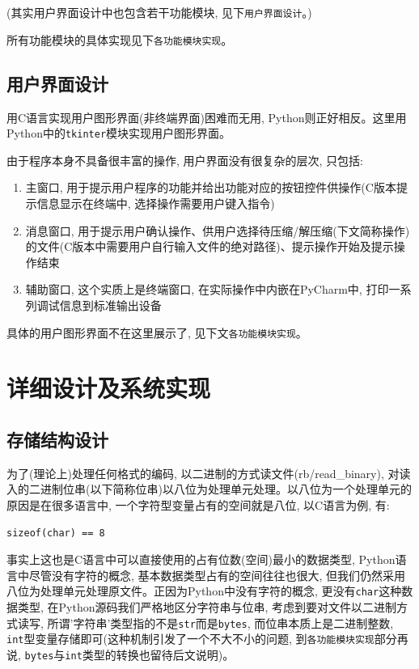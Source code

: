 \documentclass{ctexart}
\begin{document}
(其实用户界面设计中也包含若干功能模块, 见下\texttt{用户界面设计}。)

所有功能模块的具体实现见下\texttt{各功能模块实现}。

\subsection{用户界面设计}\label{header-n123}

用C语言实现用户图形界面(非终端界面)困难而无用, Python则正好相反。这里用Python中的\texttt{tkinter}模块实现用户图形界面。

由于程序本身不具备很丰富的操作, 用户界面没有很复杂的层次, 只包括:

\begin{enumerate}
\def\labelenumi{\arabic{enumi}.}
\item
  主窗口, 用于提示用户程序的功能并给出功能对应的按钮控件供操作(C版本提示信息显示在终端中, 选择操作需要用户键入指令)
\item
  消息窗口, 用于提示用户确认操作、供用户选择待压缩/解压缩(下文简称操作)的文件(C版本中需要用户自行输入文件的绝对路径)、提示操作开始及提示操作结束
\item
  辅助窗口, 这个实质上是终端窗口, 在实际操作中内嵌在PyCharm中, 打印一系列调试信息到标准输出设备
\end{enumerate}

具体的用户图形界面不在这里展示了, 见下文\texttt{各功能模块实现}。


\section{详细设计及系统实现}\label{header-n134}

\subsection{存储结构设计}\label{header-n135}

为了(理论上)处理任何格式的编码, 以二进制的方式读文件(rb/read\_binary), 对读入的二进制位串(以下简称位串)以八位为处理单元处理。以八位为一个处理单元的原因是在很多语言中, 一个字符型变量占有的空间就是八位, 以C语言为例, 有:

{\setmainfont{Courier New Bold}              
\begin{lstlisting}
sizeof(char) == 8
\end{lstlisting}}

事实上这也是C语言中可以直接使用的占有位数(空间)最小的数据类型, Python语言中尽管没有字符的概念, 基本数据类型占有的空间往往也很大, 但我们仍然采用八位为处理单元处理原文件。正因为Python中没有字符的概念, 更没有\texttt{char}这种数据类型, 在Python源码我们严格地区分字符串与位串, 考虑到要对文件以二进制方式读写, 所谓'字符串'类型指的不是\texttt{str}而是\texttt{bytes}, 而位串本质上是二进制整数,  \texttt{int}型变量存储即可(这种机制引发了一个不大不小的问题, 到\texttt{各功能模块实现}部分再说, \texttt{bytes}与\texttt{int}类型的转换也留待后文说明)。
\end{document}
